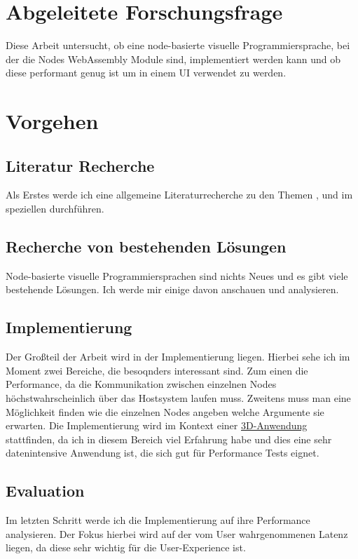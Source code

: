 \documentclass{article}
\begin{document}
\section{Abgeleitete Forschungsfrage}
Diese Arbeit untersucht, ob eine node-basierte visuelle Programmiersprache, bei der die Nodes WebAssembly Module sind, implementiert werden kann und ob diese performant genug ist um in einem UI verwendet zu werden.

\section{Vorgehen}
\subsection{Literatur Recherche}
Als Erstes werde ich eine allgemeine Literaturrecherche zu den Themen ,  und im speziellen  durchführen.

\subsection{Recherche von bestehenden Lösungen}
Node-basierte visuelle Programmiersprachen sind nichts Neues und es gibt viele bestehende Lösungen. Ich werde mir einige davon anschauen und analysieren.

\subsection{Implementierung}
Der Großteil der Arbeit wird in der Implementierung liegen. Hierbei sehe ich im Moment zwei Bereiche, die besoqnders interessant sind. Zum einen die Performance, da die Kommunikation zwischen einzelnen Nodes höchstwahrscheinlich über das Hostsystem laufen muss. Zweitens muss man eine Möglichkeit finden wie die einzelnen Nodes angeben welche Argumente sie erwarten. 
\linebreak
\linebreak
Die Implementierung wird im Kontext einer \href{https://plant.max-richter.dev}{3D-Anwendung} stattfinden, da ich in diesem Bereich viel Erfahrung habe und dies eine sehr datenintensive Anwendung ist, die sich gut für Performance Tests eignet.

\subsection{Evaluation}
Im letzten Schritt werde ich die Implementierung auf ihre Performance analysieren. Der Fokus hierbei wird auf der vom User wahrgenommenen Latenz liegen, da diese sehr wichtig für die User-Experience ist. \cite{6876022}
\end{document}
